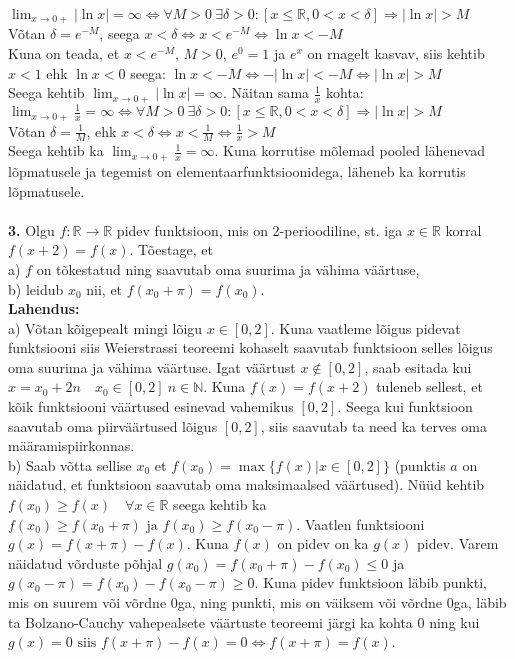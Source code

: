 \documentclass{article}
\begin{document}
$\displaystyle\lim_{x\to0+}|\ln x|=\infty\iff\forall M>0\ \exists \delta>0: [x\leq \mathbb{R}, 0<x<\delta]\Rightarrow |\ln x|>M$\\
V\~otan $\delta=e^{-M}$, seega $x<\delta\iff x<e^{-M}\iff \ln x<-M$\\
Kuna on teada, et $x<e^{-M}$, $M>0$, $e^0=1$ ja $e^x$ on rnagelt kasvav, siis kehtib $x<1$ ehk $\ln x<0$ seega:
$\ln x<-M\iff -|\ln x|<-M\iff |\ln x|>M$\\
Seega kehtib $\displaystyle\lim_{x\to0+}|\ln x|=\infty$. N\"aitan sama $\frac{1}{x}$ kohta:\\
$\displaystyle\lim_{x\to0+}\frac{1}{x}=\infty\iff\forall M>0\ \exists \delta>0: [x\leq \mathbb{R}, 0<x<\delta]\Rightarrow |\ln x|>M$\\
V\~otan $\delta=\frac{1}{M}$, ehk $x<\delta\iff x<\frac{1}{M}\iff \frac{1}{x}>M$\\
Seega kehtib ka $\displaystyle\lim_{x\to0+}\frac{1}{x}=\infty$. Kuna korrutise m\~olemad pooled l\"ahenevad l\~opmatusele ja tegemist on elementaarfunktsioonidega, l\"aheneb ka korrutis l\~opmatusele.\\\pagebreak\\
\textbf{3.} Olgu $f:\mathbb{R}\to\mathbb{R}$ pidev funktsioon, mis on 2-perioodiline, st. iga $x\in\mathbb{R}$ korral $f(x+2)=f(x)$. T\~oestage, et\\
a) $f$ on t\~okestatud ning saavutab oma suurima ja v\"ahima v\"a\"artuse,\\
b) leidub $x_0$ nii, et $f(x_0+\pi)=f(x_0)$.\\
\textbf{Lahendus:}\\
a) V\~otan k\~oigepealt mingi l\~oigu $x\in[0,2]$. Kuna vaatleme l\~oigus pidevat funktsiooni siis Weierstrassi teoreemi kohaselt saavutab funktsioon selles l\~oigus oma suurima ja v\"ahima v\"a\"artuse. Igat v\"a\"artust $x\notin[0,2]$, saab esitada kui $x=x_0+2n\quad x_0\in[0,2]\  n\in\mathbb{N}$. Kuna $f(x)=f(x+2)$ tuleneb sellest, et k\~oik funktsiooni v\"a\"artused esinevad vahemikus $[0,2]$. Seega kui funktsioon saavutab oma piirv\"a\"artused l\~oigus $[0,2]$, siis saavutab ta need ka terves oma m\"a\"aramispiirkonnas.\\
b) Saab v\~otta sellise $x_0$ et $f(x_0) = \max\{f(x)|x\in[0,2]\}$ (punktis $a$ on n\"aidatud, et funktsioon saavutab oma maksimaalsed v\"a\"artused). N\"u\"ud kehtib $f(x_0)\geq f(x)\quad \forall x\in\mathbb{R}$ seega kehtib ka $f(x_0)\geq f(x_0+\pi)\text{ ja }f(x_0)\geq f(x_0-\pi)$. Vaatlen funktsiooni $g(x)=f(x+\pi)-f(x)$. Kuna $f(x)$ on pidev on ka $g(x)$ pidev. Varem n\"aidatud v\~orduste p\~ohjal $g(x_0)=f(x_0+\pi)-f(x_0)\leq0$ ja $g(x_0-\pi)=f(x_0)-f(x_0-\pi)\geq0$. Kuna pidev funktsioon l\"abib punkti, mis on suurem v\~oi v\~ordne 0ga, ning punkti, mis on v\"aiksem v\~oi v\~ordne 0ga, l\"abib ta Bolzano-Cauchy vahepealsete v\"a\"artuste teoreemi j\"argi ka kohta 0 ning kui $g(x)=0 \text{ siis } f(x+\pi)-f(x)=0\iff f(x+\pi)=f(x)$. 
\end{document}

